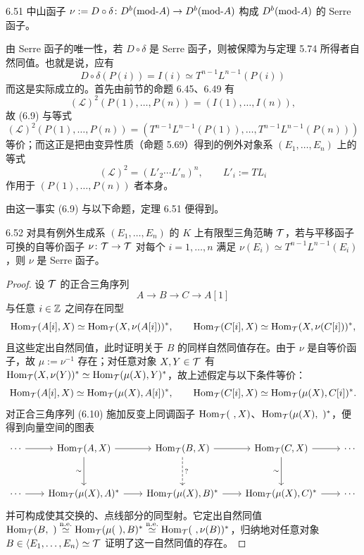 \begin{theorem}{6.51}
中山函子 $\nu:=D\circ\delta\colon D^{b}(\mathrm{mod}\text{-}A)\to D^{b}(\mathrm{mod}\text{-}A)$ 构成 $D^{b}(\mathrm{mod}\text{-}A)$ 的 Serre 函子。
\end{theorem}

由 Serre 函子的唯一性，若 $D\circ\delta$ 是 Serre 函子，则被保障为与定理 5.74 所得者自然同值。也就是说，应有
\begin{equation}
D\circ\delta(P(i))=I(i)\simeq T^{n-1}L^{n-1}(P(i)) \tag{6.9}
\end{equation}
而这是实际成立的。首先由前节的命题 6.45、6.49 有
\[
(\mathcal L)^{2}(P(1),\dots,P(n))=(I(1),\dots,I(n)),
\]
故 (6.9) 与等式
\[
(\mathcal L)^{2}(P(1),\dots,P(n))=(T^{n-1}L^{n-1}(P(1)),\dots,T^{n-1}L^{n-1}(P(n)))
\]
等价；而这正是把由变异性质（命题 5.69）得到的例外对象系 $(E_1,\dots,E_n)$ 上的等式
\[
(\mathcal L)^{2}=(L'_2\cdots L'_n)^{n},\qquad L'_i:=TL_i
\]
作用于 $(P(1),\dots,P(n))$ 者本身。

由这一事实 (6.9) 与以下命题，定理 6.51 便得到。

\begin{proposition}{6.52}
对具有例外生成系 $(E_1,\dots,E_n)$ 的 $K$ 上有限型三角范畴 $\mathcal{T}$，若与平移函子可换的自等价函子 $\nu\colon\mathcal{T}\to\mathcal{T}$ 对每个 $i=1,\dots,n$ 满足 $\nu(E_i)\simeq T^{n-1}L^{n-1}(E_i)$，则 $\nu$ 是 Serre 函子。
\end{proposition}

\begin{proof}
设 $\mathcal{T}$ 的正合三角序列
\begin{equation}
A\to B\to C\to A[1] \tag{6.10}
\end{equation}
与任意 $i\in\mathbb{Z}$ 之间存在同型
\[
\operatorname{Hom}_{\mathcal{T}}(A[i],X)\simeq\operatorname{Hom}_{\mathcal{T}}(X,\nu(A[i]))^{*},\qquad
\operatorname{Hom}_{\mathcal{T}}(C[i],X)\simeq\operatorname{Hom}_{\mathcal{T}}(X,\nu(C[i]))^{*},
\]
且这些定出自然同值，此时证明关于 $B$ 的同样自然同值存在。由于 $\nu$ 是自等价函子，故 $\mu:=\nu^{-1}$ 存在；对任意对象 $X,Y\in\mathcal{T}$ 有 $\operatorname{Hom}_{\mathcal{T}}(X,\nu(Y))^{*}\simeq\operatorname{Hom}_{\mathcal{T}}(\mu(X),Y)^{*}$，故上述假定与以下条件等价：
\[
\operatorname{Hom}_{\mathcal{T}}(A[i],X)\simeq\operatorname{Hom}_{\mathcal{T}}(\mu(X),A[i])^{*},\qquad
\operatorname{Hom}_{\mathcal{T}}(C[i],X)\simeq\operatorname{Hom}_{\mathcal{T}}(\mu(X),C[i])^{*}.
\]
对正合三角序列 (6.10) 施加反变上同调函子 $\operatorname{Hom}_{\mathcal{T}}(\ ,X)$、$\Hom_{\cT}(\mu(X),\ )^{*}$，便得到向量空间的图表
\[\begin{tikzcd}[row sep=3.0em, column sep=2.0em]
  \cdots \arrow[r] & \Hom_{\cT}(A,X) \arrow[r] \arrow[d,"\sim"'] & \Hom_{\cT}(B,X) \arrow[r] \arrow[d,dashed,"?"] & \Hom_{\cT}(C,X) \arrow[r] \arrow[d,"\sim"'] & \cdots \\
  \cdots \arrow[r] & \Hom_{\cT}(\mu(X),A)^{*} \arrow[r] & \Hom_{\cT}(\mu(X),B)^{*} \arrow[r] & \Hom_{\cT}(\mu(X),C)^{*} \arrow[r] & \cdots
\end{tikzcd}\]
并可构成使其交换的、点线部分的同型射。它定出自然同值 $\Hom_{\cT}(B,\ )\overset{\mathrm{n.e.}}{\simeq}\Hom_{\cT}(\mu(\ ),B)^{*}\overset{\mathrm{n.e.}}{\simeq}\Hom_{\cT}(\ ,\nu(B))^{*}$，归纳地对任意对象 $B\in\langle E_1,\dots,E_n\rangle\simeq\mathcal{T}$ 证明了这一自然同值的存在。
\end{proof}

